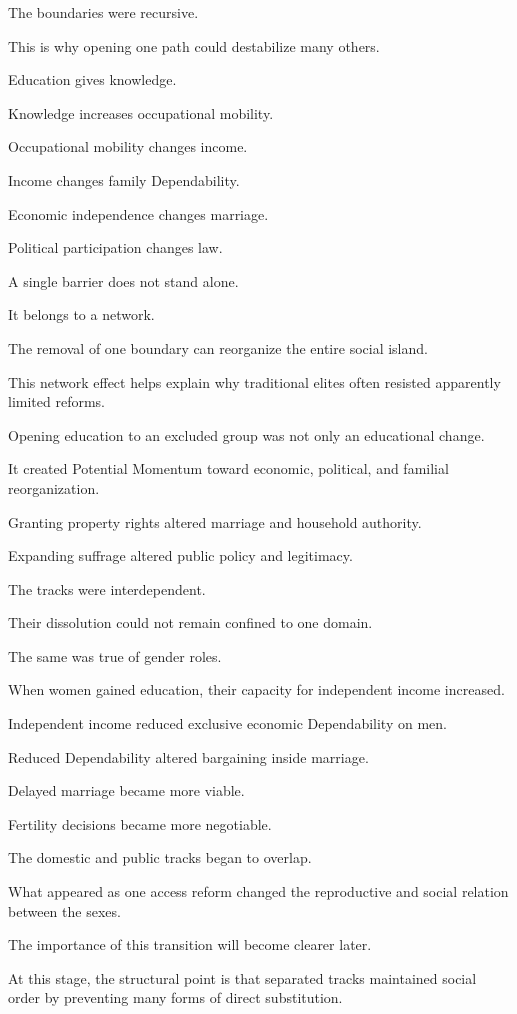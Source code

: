 The boundaries were recursive.

This is why opening one path could destabilize many others.

Education gives knowledge.

Knowledge increases occupational mobility.

Occupational mobility changes income.

Income changes family Dependability.

Economic independence changes marriage.

Political participation changes law.

A single barrier does not stand alone.

It belongs to a network.

The removal of one boundary can reorganize the entire social island.

This network effect helps explain why traditional elites often resisted apparently limited reforms.

Opening education to an excluded group was not only an educational change.

It created Potential Momentum toward economic, political, and familial reorganization.

Granting property rights altered marriage and household authority.

Expanding suffrage altered public policy and legitimacy.

The tracks were interdependent.

Their dissolution could not remain confined to one domain.

The same was true of gender roles.

When women gained education, their capacity for independent income increased.

Independent income reduced exclusive economic Dependability on men.

Reduced Dependability altered bargaining inside marriage.

Delayed marriage became more viable.

Fertility decisions became more negotiable.

The domestic and public tracks began to overlap.

What appeared as one access reform changed the reproductive and social relation between the sexes.

The importance of this transition will become clearer later.

At this stage, the structural point is that separated tracks maintained social order by preventing many forms of direct substitution.

